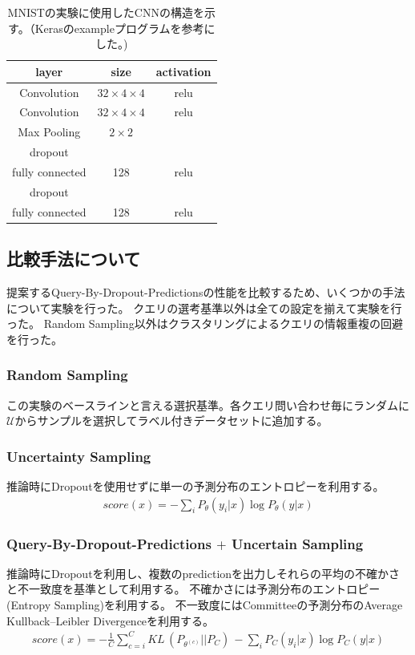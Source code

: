 \begin{table}[h]
    \label{table:mnist_cnn}
    \caption{MNISTの実験に使用したCNNの構造を示す。（Kerasのexampleプログラムを参考にした。)}
    \center
    \begin{tabular}{|c|c|c|} \hline
        layer & size & activation \\ \hline
        Convolution & $32 \times 4 \times 4$ & relu \\
        Convolution & $32 \times 4 \times 4$ & relu \\
        Max Pooling & $2 \times 2$ & \\
        dropout & & \\
        fully connected & 128 & relu \\
        dropout & & \\
        fully connected & 128 & relu \\
        \hline
    \end{tabular}
  \end{table}

\subsection{比較手法について}
提案するQuery-By-Dropout-Predictionsの性能を比較するため、いくつかの手法について実験を行った。
クエリの選考基準以外は全ての設定を揃えて実験を行った。
Random Sampling以外はクラスタリングによるクエリの情報重複の回避を行った。

\subsubsection{Random Sampling}
この実験のベースラインと言える選択基準。各クエリ問い合わせ毎にランダムに$\mathcal{U}$からサンプルを選択してラベル付きデータセットに追加する。

\subsubsection{Uncertainty Sampling}
推論時にDropoutを使用せずに単一の予測分布のエントロピーを利用する。
\begin{eqnarray}
    score(x) =  - \sum_i {P_{\theta}(y_i|x)} \log P_{\theta}(y|x)
\end{eqnarray}

\subsubsection{Query-By-Dropout-Predictions $+$ Uncertain Sampling}
推論時にDropoutを利用し、複数のpredictionを出力しそれらの平均の不確かさと不一致度を基準として利用する。
不確かさには予測分布のエントロピー(Entropy Sampling)を利用する。
不一致度にはCommitteeの予測分布のAverage Kullback–Leibler Divergenceを利用する。
\begin{eqnarray}
    score(x) =  -  \frac{1}{C} \sum_{c=i}^C KL \, (P_{\theta^{(c)}} || P_C) \, - \sum_i {P_C(y_i|x)} \log P_C(y|x)
\end{eqnarray}

